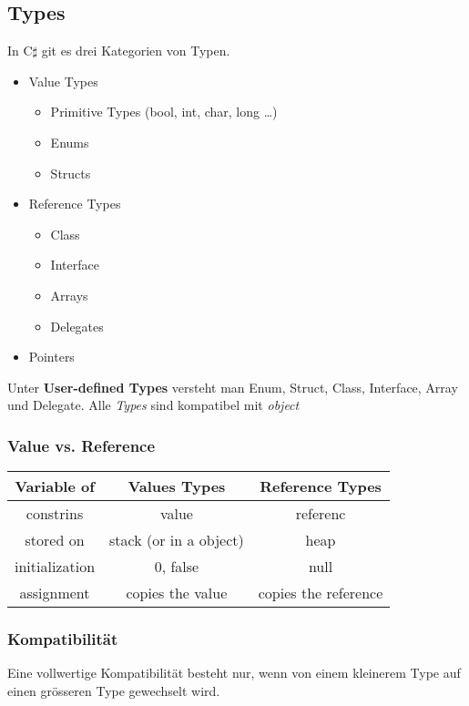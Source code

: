 \subsection{Types}

In C$\sharp$ git es drei Kategorien von Typen. 
\begin{itemize}
	\item Value Types
	\begin{itemize}
		\item Primitive Types (bool, int, char, long \ldots)
		\item Enums
		\item Structs
	\end{itemize}
	\item Reference Types
	\begin{itemize}
		\item Class
		\item Interface
		\item Arrays
		\item Delegates
	\end{itemize}
	\item Pointers
\end{itemize}

Unter \textbf{User-defined Types} versteht man Enum, Struct, Class, Interface, Array und Delegate.
Alle \emph{Types} sind kompatibel mit \emph{object}

\subsubsection{Value vs. Reference}
\begin{tabular}{|c|c|c|}
	\hline
	\textbf{Variable of} & \textbf{Values Types}  & \textbf{Reference Types} \\ \hline
	     constrins       &         value          &         referenc         \\ \hline
	     stored on       & stack (or in a object) &           heap           \\ \hline
	   initialization    &        0, false        &           null           \\ \hline
	     assignment      &    copies the value    &   copies the reference   \\ \hline
\end{tabular} 
\subsubsection{Kompatibilität}
Eine vollwertige Kompatibilität besteht nur, wenn von einem kleinerem Type auf einen grösseren Type gewechselt wird.

